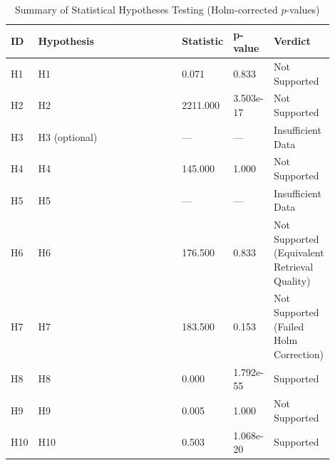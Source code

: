 \begin{table}[t]
\centering
\small
\begin{tabular}{p{0.05\linewidth} p{0.45\linewidth} p{0.15\linewidth} p{0.1\linewidth} p{0.15\linewidth}}
\toprule
\textbf{ID} & \textbf{Hypothesis} & \textbf{Statistic} & \textbf{p-value} & \textbf{Verdict} \\
\midrule
H1 & H1 & 0.071 & 0.833 & Not Supported \\
H2 & H2 & 2211.000 & 3.503e-17 & Not Supported \\
H3 & H3 (optional) & --- & --- & Insufficient Data \\
H4 & H4 & 145.000 & 1.000 & Not Supported \\
H5 & H5 & --- & --- & Insufficient Data \\
H6 & H6 & 176.500 & 0.833 & Not Supported (Equivalent Retrieval Quality) \\
H7 & H7 & 183.500 & 0.153 & Not Supported (Failed Holm Correction) \\
H8 & H8 & 0.000 & 1.792e-55 & Supported \\
H9 & H9 & 0.005 & 1.000 & Not Supported \\
H10 & H10 & 0.503 & 1.068e-20 & Supported \\
\bottomrule
\end{tabular}
\caption{Summary of Statistical Hypotheses Testing (Holm-corrected $p$-values)}
\label{tab:hypotheses}
\end{table}
